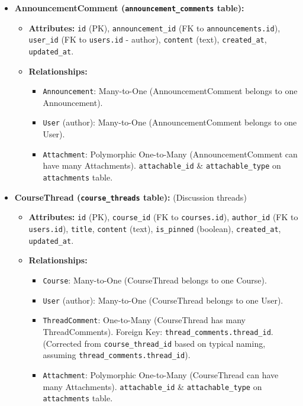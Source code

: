 \documentclass[12pt,a4paper]{article}
\begin{document}
\begin{itemize}
\begin{itemize}
\begin{itemize}
        \end{itemize}
    \end{itemize}
    \item \textbf{AnnouncementComment (\texttt{announcement\_comments} table):}
    \begin{itemize}
        \item \textbf{Attributes:} \texttt{id} (PK), \texttt{announcement\_id} (FK to \texttt{announcements.id}), \texttt{user\_id} (FK to \texttt{users.id} - author), \texttt{content} (text), \texttt{created\_at}, \texttt{updated\_at}.
        \item \textbf{Relationships:}
        \begin{itemize}
            \item \texttt{Announcement}: Many-to-One (AnnouncementComment belongs to one Announcement).
            \item \texttt{User} (author): Many-to-One (AnnouncementComment belongs to one User).
            \item \texttt{Attachment}: Polymorphic One-to-Many (AnnouncementComment can have many Attachments). \texttt{attachable\_id} \& \texttt{attachable\_type} on \texttt{attachments} table.
        \end{itemize}
    \end{itemize}
    \item \textbf{CourseThread (\texttt{course\_threads} table):} (Discussion threads)
    \begin{itemize}
        \item \textbf{Attributes:} \texttt{id} (PK), \texttt{course\_id} (FK to \texttt{courses.id}), \texttt{author\_id} (FK to \texttt{users.id}), \texttt{title}, \texttt{content} (text), \texttt{is\_pinned} (boolean), \texttt{created\_at}, \texttt{updated\_at}.
        \item \textbf{Relationships:}
        \begin{itemize}
            \item \texttt{Course}: Many-to-One (CourseThread belongs to one Course).
            \item \texttt{User} (author): Many-to-One (CourseThread belongs to one User).
            \item \texttt{ThreadComment}: One-to-Many (CourseThread has many ThreadComments). Foreign Key: \texttt{thread\_comments.thread\_id}. (Corrected from \texttt{course\_thread\_id} based on typical naming, assuming \texttt{thread\_comments.thread\_id}).
            \item \texttt{Attachment}: Polymorphic One-to-Many (CourseThread can have many Attachments). \texttt{attachable\_id} \& \texttt{attachable\_type} on \texttt{attachments} table.

\end{itemize}
\end{itemize}
\end{itemize}
\end{document}
